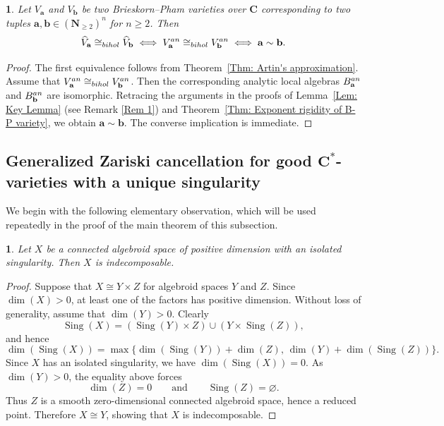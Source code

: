 \documentclass[10pt,a4paper]{amsart}
\numberwithin{equation}{section}
\numberwithin{figure}{section}
\newtheorem{lem}[thm]{\protect\lemmaname}
\newtheorem{cor}[thm]{\protect\corollaryname}
\providecommand{\lemmaname}{Lemma}
\providecommand{\corollaryname}{Corollary}
\numberwithin{equation}{section}
\newcommand{\C}{\mathbf{C}}
\newcommand{\N}{\mathbf{N}}
\newcommand{\ba}{\mathbf{a}}
\newcommand{\bb}{\mathbf{b}}
\newcommand{\Sing}{\operatorname{Sing}}
\begin{document}
\begin{cor}\label{Cor: Exponent rigidity of B-P variety in analytic setting over complex numbers}
Let $V_\ba$ and $V_\bb$ be two Brieskorn--Pham varieties over $\C$ corresponding to two tuples $\ba,\bb\in(\N_{\geq 2})^n$ for $n\geq 2$. Then
\[
\widehat{V}_\ba \cong_{\rm bihol} \widehat{V}_\bb
\iff
V_\ba^{\rm an} \cong_{\rm bihol} V_\bb^{\rm an}
\iff
\ba\sim\bb.
\]
\end{cor}

\begin{proof}
The first equivalence follows from Theorem~\ref{Thm: Artin's approximation}. Assume that $V_\ba^{\rm an} \cong_{\rm bihol} V_\bb^{\rm an}$. Then the corresponding analytic local algebras $B_\ba^{\rm an}$ and $B_\bb^{\rm an}$ are isomorphic. Retracing the arguments in the proofs of Lemma~\ref{Lem: Key Lemma} (see Remark \ref{Rem 1}) and Theorem~\ref{Thm: Exponent rigidity of B-P variety}, we obtain $\ba\sim\bb$. The converse implication is immediate.
\end{proof}

\subsection{Generalized Zariski cancellation for good $\C^*$-varieties with a unique singularity}\label{subse3.2}

We begin with the following elementary observation, which will be used repeatedly in the proof of the main theorem of this subsection.

\begin{lem}\label{Lem: Isolated implies indecomposable}
Let $X$ be a connected algebroid space of positive dimension with an isolated singularity. Then $X$ is indecomposable.
\end{lem}

\begin{proof}
Suppose that $X \cong Y \times Z$ for algebroid spaces $Y$ and $Z$. Since $\dim(X)>0$, at least one of the factors has positive dimension. Without loss of generality, assume that $\dim(Y)>0$. Clearly
\[
\Sing(X)
=
(\Sing(Y)\times Z)
\cup
(Y\times \Sing(Z)),
\]
and hence
\[
\dim(\Sing(X))
=
\max\{
\dim(\Sing(Y))+\dim(Z),
\,
\dim(Y)+\dim(\Sing(Z))
\}.
\]
Since $X$ has an isolated singularity, we have $\dim(\Sing(X))=0$. As $\dim(Y)>0$, the equality above forces
\[
\dim(Z)=0
\qquad\text{and}\qquad
\Sing(Z)=\varnothing.
\]
Thus $Z$ is a smooth zero-dimensional connected algebroid space, hence a reduced point. Therefore $X \cong Y$, showing that $X$ is indecomposable.
\end{proof}
\end{document}

